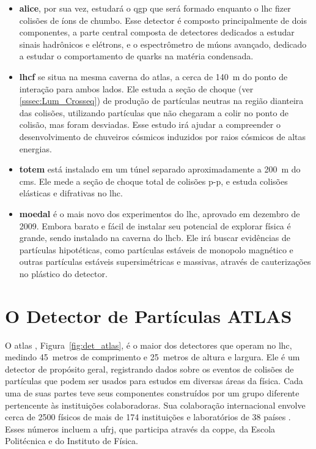 \begin{itemize}
\item \textbf{\gls{alice}}, por sua vez, estudará o \gls{qgp} que será formado
enquanto o \gls{lhc} fizer colisões de íons de chumbo. Esse detector é composto
principalmente de dois componentes, a parte central composta de detectores dedicados
a estudar sinais hadrônicos e elétrons, e o espectrômetro de múons avançado,
dedicado a estudar o comportamento de quarks na matéria condensada.
\item \textbf{\gls{lhcf}} se situa na mesma caverna do \gls{atlas}, a cerca de
140~m do ponto de interação para ambos lados. Ele estuda a seção de choque (ver
\ref{sssec:Lum_Crosseq}) de produção de
partículas neutras na região dianteira das colisões, utilizando
partículas que não chegaram a colir no ponto de colisão, 
mas foram desviadas. Esse estudo irá ajudar a compreender o desenvolvimento de
chuveiros cósmicos induzidos por raios cósmicos de altas energias.
\item \textbf{\gls{totem}} está instalado em um túnel separado aproximadamente a
200~m do \gls{cms}. Ele mede a seção de choque total de colisões p-p, e estuda colisões 
elásticas e difrativas no \gls{lhc}. 
\item \textbf{\gls{moedal}} é o mais novo dos experimentos do \gls{lhc},
aprovado em dezembro de 2009. Embora barato e fácil de instalar seu potencial
de explorar física é grande, sendo instalado na caverna do \gls{lhcb}. 
Ele irá buscar evidências de partículas hipotéticas, como partículas estáveis de monopolo
magnético e outras partículas estáveis supersimétricas e massivas, através de
cauterizações no plástico do detector.
\end{itemize}

\section{O Detector de Partículas ATLAS}
\label{sec:ATLAS}

O \gls{atlas} \cite{ATLAS_TDR,ATLAS_TDR2,paper_atlas}, Figura~\ref{fig:det_atlas}, é o maior dos detectores que operam
no \gls{lhc}, medindo 45~metros de comprimento e 25~metros de altura e largura. 
Ele é um detector de propósito geral, registrando dados sobre os eventos de
colisões de partículas que podem ser usados para estudos em diversas áreas da
física. Cada uma de suas partes teve seus componentes 
construídos por um grupo diferente pertencente às instituições colaboradoras. 
Sua colaboração internacional envolve cerca de 2500 físicos de mais de 174 instituições 
e laboratórios de 38 países \cite{webATLAS}. 
Esses números incluem a \acrshort{ufrj}, que participa através da
\acrshort{coppe}, da Escola Politécnica e do Instituto de Física. 

